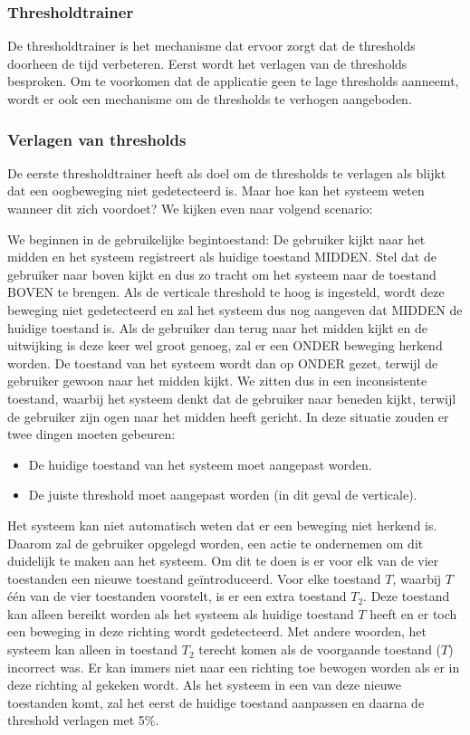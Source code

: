 \documentclass{article}
\begin{document}
\subsubsection{Thresholdtrainer}
\label{sec:trainer}
De thresholdtrainer is het mechanisme dat ervoor zorgt dat de thresholds doorheen de tijd verbeteren. Eerst wordt het verlagen van de thresholds besproken. Om te voorkomen dat de applicatie geen te lage thresholds aanneemt, wordt er ook een mechanisme om de thresholds te verhogen aangeboden.
\subsubsection*{Verlagen van thresholds}
De eerste thresholdtrainer heeft als doel om de thresholds te verlagen als blijkt dat een oogbeweging niet gedetecteerd is. Maar hoe kan het systeem weten wanneer dit zich voordoet? We kijken even naar volgend scenario:

We beginnen in de gebruikelijke begintoestand: De gebruiker kijkt naar het midden en het systeem registreert als huidige toestand MIDDEN. Stel dat de gebruiker naar boven kijkt en dus zo tracht om het systeem naar de toestand BOVEN te brengen. Als de verticale threshold te hoog is ingesteld, wordt deze beweging niet gedetecteerd en zal het systeem dus nog aangeven dat MIDDEN de huidige toestand is. Als de gebruiker dan terug naar het midden kijkt en de uitwijking is deze keer wel groot genoeg, zal er een ONDER beweging herkend worden. De toestand van het systeem wordt dan op ONDER gezet, terwijl de gebruiker gewoon naar het midden kijkt. We zitten dus in een inconsistente toestand, waarbij het systeem denkt dat de gebruiker naar beneden kijkt, terwijl de gebruiker zijn ogen naar het midden heeft gericht. In deze situatie zouden er twee dingen moeten gebeuren:
\begin{itemize}
	\item De huidige toestand van het systeem moet aangepast worden.
	\item De juiste threshold moet aangepast worden (in dit geval de verticale).
\end{itemize}

Het systeem kan niet automatisch weten dat er een beweging niet herkend is. Daarom zal de gebruiker opgelegd worden, een actie te ondernemen om dit duidelijk te maken aan het systeem. Om dit te doen is er voor elk van de vier toestanden een nieuwe toestand geïntroduceerd. Voor elke toestand $T$, waarbij $T$ \'e\'en van de vier toestanden voorstelt, is er een extra toestand $T_2$. Deze toestand kan alleen bereikt worden als het systeem als huidige toestand $T$ heeft en er toch een beweging in deze richting wordt gedetecteerd.  Met andere woorden, het systeem kan alleen in toestand $T_2$ terecht komen als de voorgaande toestand ($T$) incorrect was. Er kan immers niet naar een richting toe bewogen worden als er in deze richting al gekeken wordt. Als het systeem in een van deze nieuwe toestanden komt, zal het eerst de huidige toestand aanpassen en daarna de threshold verlagen met 5\%.\\
\end{document}
